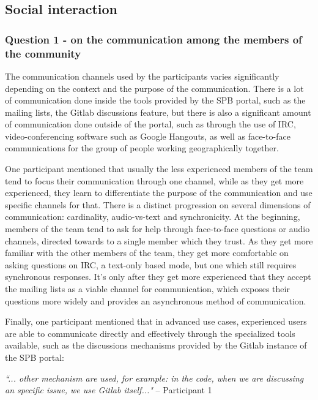 \documentclass{sigchi}
\begin{document}
\subsection{Social interaction}

\subsubsection{Question 1 - on the communication among the members of the community}
The communication channels used by the participants varies significantly depending on the context and the purpose of the communication. There is a lot of communication done inside the tools provided by the SPB portal, such as the mailing lists, the Gitlab discussions feature, but there is also a significant amount of communication done outside of the portal, such as through the use of IRC, video-conferencing software such as Google Hangouts, as well as face-to-face communications for the group of people working geographically together.

One participant mentioned that usually the less experienced members of the team tend to focus their communication through one channel, while as they get more experienced, they learn to differentiate the purpose of the communication and use specific channels for that. There is a distinct progression on several dimensions of communication: cardinality, audio-vs-text and synchronicity. At the beginning, members of the team tend to ask for help through face-to-face questions or audio channels, directed towards to a single member which they trust. As they get more familiar with the other members of the team, they get more comfortable on asking questions on IRC, a text-only based mode, but one which still requires synchronous responses. It's only after they get more experienced that they accept the mailing lists as a viable channel for communication, which exposes their questions more widely and provides an asynchronous method of communication.

Finally, one participant mentioned that in advanced use cases, experienced users are able to communicate directly and effectively through the specialized tools available, such as the discussions mechanisms provided by the Gitlab instance of the SPB portal:

\begin{displayquote}
\textit{``... other mechanism are used, for example: in the code, when we are discussing an specific issue, we use Gitlab itself..."} – Participant 1
\end{displayquote}
\end{document}
